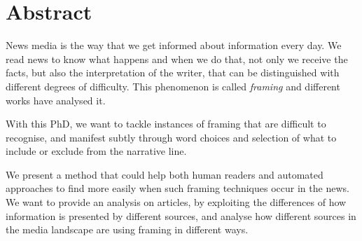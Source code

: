 \chapter*{Abstract}

News media is the way that we get informed about information every day.
We read news to know what happens and when we do that, not only we receive the facts, but also the interpretation of the writer, that can be distinguished with different degrees of difficulty.
This phenomenon is called \emph{framing} and different works have analysed it.

With this PhD, we want to tackle instances of framing that are difficult to recognise, and manifest subtly through word choices and selection of what to include or exclude from the narrative line.

We present a method that could help both human readers and automated approaches to find more easily when such framing techniques occur in the news.
We want to provide an analysis on articles, by exploiting the differences of how information is presented by different sources, and analyse how different sources in the media landscape are using framing in different ways.
